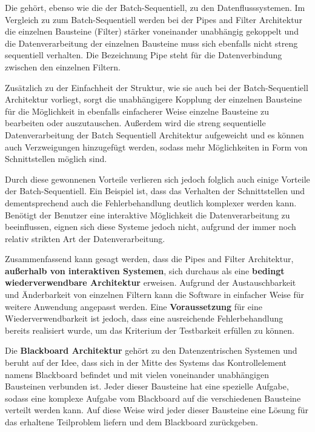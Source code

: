 \documentclass[utf8,biblatex]{lni}
\begin{document}

Die  gehört, ebenso wie die der Batch-Sequentiell, zu den Datenflusssystemen. Im Vergleich zu zum Batch-Sequentiell werden bei der Pipes and Filter Architektur die einzelnen Bausteine (Filter) stärker voneinander unabhängig gekoppelt und die Datenverarbeitung der einzelnen Bausteine muss sich ebenfalls nicht streng sequentiell verhalten. Die Bezeichnung Pipe steht für die Datenverbindung zwischen den einzelnen Filtern.

Zusätzlich zu der Einfachheit der Struktur, wie sie auch bei der Batch-Sequentiell Architektur vorliegt, sorgt die unabhängigere Kopplung der einzelnen Bausteine für die Möglichkeit in ebenfalls einfacherer Weise einzelne Bausteine zu bearbeiten oder auszutauschen. Außerdem wird die streng sequentielle Datenverarbeitung der Batch Sequentiell Architektur aufgeweicht und es können auch Verzweigungen hinzugefügt werden, sodass mehr Möglichkeiten in Form von Schnittstellen möglich sind.

Durch diese gewonnenen Vorteile verlieren sich jedoch folglich auch einige Vorteile der Batch-Sequentiell. Ein Beispiel ist, dass das Verhalten der Schnittstellen und dementsprechend auch die Fehlerbehandlung deutlich komplexer werden kann. Benötigt der Benutzer eine interaktive Möglichkeit die Datenverarbeitung zu beeinflussen, eignen sich diese Systeme jedoch nicht, aufgrund der immer noch relativ strikten Art der Datenverarbeitung.

Zusammenfassend kann gesagt werden, dass die Pipes and Filter Architektur, \textbf{außerhalb von interaktiven Systemen}, sich durchaus als eine \textbf{bedingt wiederverwendbare Architektur} erweisen. Aufgrund der Austauschbarkeit und Änderbarkeit von einzelnen Filtern kann die Software in einfacher Weise für weitere Anwendung angepasst werden. Eine \textbf{Voraussetzung} für eine Wiederverwendbarkeit ist jedoch, dass eine ausreichende Fehlerbehandlung bereits realisiert wurde, um das Kriterium der Testbarkeit erfüllen zu können.


Die \textbf{Blackboard Architektur} gehört zu den Datenzentrischen Systemen und beruht auf der Idee, dass sich in der Mitte des Systems das Kontrollelement namens Blackboard befindet und mit vielen voneinander unabhängigen Bausteinen verbunden ist. Jeder dieser Bausteine hat eine spezielle Aufgabe, sodass eine komplexe Aufgabe vom Blackboard auf die verschiedenen Bausteine verteilt werden kann. Auf diese Weise wird jeder dieser Bausteine eine Lösung für das erhaltene Teilproblem liefern und dem Blackboard zurückgeben.
\end{document}
